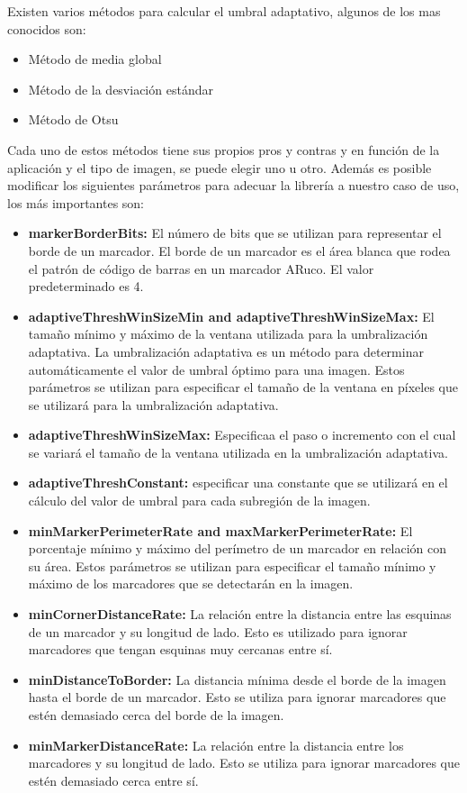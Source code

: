 Existen varios métodos para calcular el umbral adaptativo, algunos de los mas conocidos son:
\begin{itemize}
\item Método de media global
\item Método de la desviación estándar
\item Método de Otsu
\end{itemize}
Cada uno de estos métodos tiene sus propios pros y contras y en función de la aplicación y el tipo de imagen, se puede elegir uno u otro.
Además es posible modificar los siguientes parámetros para adecuar la librería a nuestro caso de uso, los más importantes son:
\begin{itemize}
    \item   \textbf{markerBorderBits:}
    El número de bits que se utilizan para representar el borde de un marcador. El borde de un marcador es el área blanca que rodea el patrón de código de barras en un marcador ARuco. El valor predeterminado es 4.
    \item \textbf{adaptiveThreshWinSizeMin and adaptiveThreshWinSizeMax:}
    El tamaño mínimo y máximo de la ventana utilizada para la umbralización adaptativa. La umbralización adaptativa es un método para determinar automáticamente el valor de umbral óptimo para una imagen. Estos parámetros se utilizan para especificar el tamaño de la ventana en píxeles que se utilizará para la umbralización adaptativa.
    \item \textbf{adaptiveThreshWinSizeMax:}
    Especificaa el paso o incremento con el cual se variará el tamaño de la ventana utilizada en la umbralización adaptativa.
    \item \textbf{adaptiveThreshConstant:}
    especificar una constante que se utilizará en el cálculo del valor de umbral para cada subregión de la imagen.
    \item \textbf{minMarkerPerimeterRate and maxMarkerPerimeterRate:}
    El porcentaje mínimo y máximo del perímetro de un marcador en relación con su área. Estos parámetros se utilizan para especificar el tamaño mínimo y máximo de los marcadores que se detectarán en la imagen.
    \item \textbf{minCornerDistanceRate:}
    La relación entre la distancia entre las esquinas de un marcador y su longitud de lado. Esto es utilizado para ignorar marcadores que tengan esquinas muy cercanas entre sí.
    \item \textbf{minDistanceToBorder:}
    La distancia mínima desde el borde de la imagen hasta el borde de un marcador. Esto se utiliza para ignorar marcadores que estén demasiado cerca del borde de la imagen.
    \item \textbf{ minMarkerDistanceRate:}
    La relación entre la distancia entre los marcadores y su longitud de lado. Esto se utiliza para ignorar marcadores que estén demasiado cerca entre sí.
\end{itemize}

